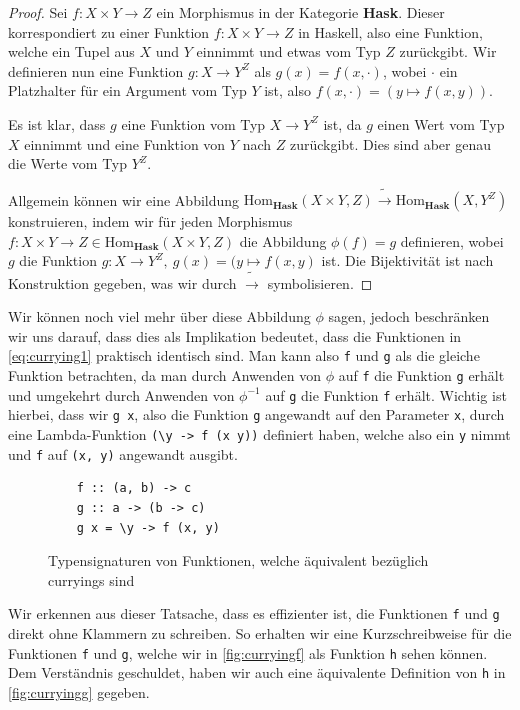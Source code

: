 \documentclass{hhuarticle}
\theoremstyle{definition}
\theoremstyle{theorem}
\begin{document}
  \begin{proof}
    Sei $f: X \times Y \to Z$ ein Morphismus in der Kategorie \textbf{Hask}.
    Dieser korrespondiert zu einer Funktion $f: X \times Y \to Z$ in Haskell,
    also eine Funktion, welche ein Tupel aus $X$ und $Y$ einnimmt und etwas
    vom Typ $Z$ zurückgibt. Wir definieren nun eine Funktion
    $g: X \to Y^Z$ als $g(x) = f(x, \cdot)$, wobei $\cdot$ ein Platzhalter
    für ein Argument vom Typ $Y$ ist, also
    $f(x, \cdot) = (y \mapsto f(x, y))$.

    Es ist klar, dass $g$ eine Funktion vom Typ $X \to Y^Z$ ist, da
    $g$ einen Wert vom Typ $X$ einnimmt und eine Funktion von $Y$ nach $Z$
    zurückgibt. Dies sind aber genau die Werte vom Typ $Y^Z$.

    Allgemein können wir eine Abbildung
    $\text{Hom}_\textbf{Hask}(X \times Y, Z) \tilde\to \text{Hom}_\textbf{Hask}(X, Y^Z)$
    konstruieren, indem wir für jeden Morphismus $f: X \times Y \to Z \in \text{Hom}_\textbf{Hask}(X \times Y, Z)$
    die Abbildung $\phi(f) = g$ definieren, wobei $g$ die Funktion
    $g: X \to Y^Z, \> g(x) = (y \mapsto f(x,y)$ ist. Die Bijektivität
    ist nach Konstruktion gegeben, was wir durch $\tilde \to$ symbolisieren.
  \end{proof}

  Wir können noch viel mehr über diese Abbildung $\phi$ sagen, jedoch
  beschränken wir uns darauf, dass dies als Implikation bedeutet, dass
  die Funktionen in \cref{eq:currying1} praktisch identisch sind.
  Man kann also \verb|f| und \verb|g| als die gleiche Funktion
  betrachten, da man durch Anwenden von $\phi$ auf \verb|f| die Funktion
  \verb|g| erhält und umgekehrt durch Anwenden von $\phi^{-1}$ auf \verb|g|
  die Funktion \verb|f| erhält. Wichtig ist hierbei,
  dass wir \verb|g x|, also die Funktion \verb|g| angewandt auf
  den Parameter \verb|x|, durch eine Lambda-Funktion
  \verb|(\y -> f (x y))| definiert haben, welche also ein \verb|y| nimmt
  und \verb|f| auf \verb|(x, y)| angewandt ausgibt.

  \begin{figure}[h]
    \begin{lstlisting}
    f :: (a, b) -> c
    g :: a -> (b -> c)
    g x = \y -> f (x, y)
    \end{lstlisting}
    \caption{Typensignaturen von Funktionen, welche äquivalent bezüglich curryings sind}%
    \label{fig:currying1}
  \end{figure}

  Wir erkennen aus dieser Tatsache, dass es effizienter ist, die Funktionen
  \verb|f| und \verb|g| direkt ohne Klammern zu schreiben. So erhalten wir
  eine Kurzschreibweise für die Funktionen \verb|f| und \verb|g|, welche
  wir in \cref{fig:curryingf} als Funktion \verb|h| sehen können.
  Dem Verständnis geschuldet, haben wir auch eine äquivalente Definition
  von \verb|h| in \cref{fig:curryingg} gegeben.
\end{document}
